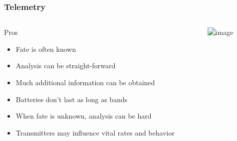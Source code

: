 \documentclass[color=usenames,dvipsnames]{beamer}\usepackage[]{graphicx}\usepackage[]{color}
\begin{document}
\begin{frame}
  \frametitle{Telemetry}
  \begin{columns}
    \begin{column}{0.5\textwidth}
      {\large%
        Pros}
      \begin{itemize}
        \item Fate is often known
        \item Analysis can be straight-forward
        \item Much additional information can be obtained
      \end{itemize}
      \begin{itemize}[<2->]
        \item Batteries don't last as long as bands
        \item When fate is unknown, analysis can be hard
        \item Transmitters may influence vital rates and behavior
      \end{itemize}
    \end{column}
    \begin{column}{0.5\textwidth}
      \includegraphics<1->[width=\textwidth]{figs/saltie} \\
      \vfill
    \end{column}
  \end{columns}
\end{frame}



\end{document}

